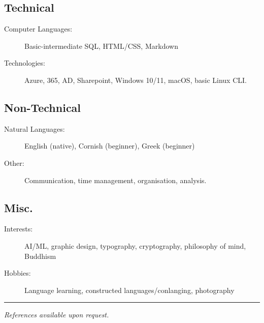 \documentclass[10pt,a4paper]{article}
\newenvironment{indentsection}[1]%
{\begin{list}{}%
	{\setlength{\leftmargin}{#1}}%
	\item[]%
}
{\end{list}}
\begin{document}
\subsection*{Technical}
\begin{indentsection}{\parindent}
\begin{description}
	\item[Computer Languages:]
	Basic-intermediate SQL, HTML/CSS, Markdown
    \item[Technologies:]
    Azure, 365, AD, Sharepoint, Windows 10/11, macOS, basic Linux CLI.
\end{description}
\end{indentsection}
\subsection*{Non-Technical}
\begin{indentsection}{\parindent}
\begin{description}
	\item[Natural Languages:]
	English (native), Cornish (beginner), Greek (beginner)
    \item[Other:]
    Communication, time management, organisation, analysis.
\end{description}
\end{indentsection}

\subsection*{Misc.}
\begin{indentsection}{\parindent}
\begin{description}
	\item[Interests:]
	AI/ML, graphic design, typography, cryptography, philosophy of mind, Buddhism
	\item[Hobbies:]
	Language learning, constructed languages/conlanging, photography
\end{description}
\end{indentsection}

\vspace{1em}
\hrule
\vspace{2em}

\begin{center}
    \color{gray}\small\emph{References available upon request.}
\end{center}
\thispagestyle{empty}
\end{document}
